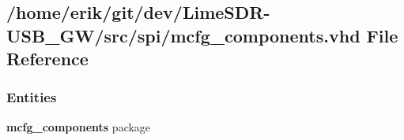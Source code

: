 \subsection{/home/erik/git/dev/\+Lime\+S\+D\+R-\/\+U\+S\+B\+\_\+\+G\+W/src/spi/mcfg\+\_\+components.vhd File Reference}
\label{mcfg__components_8vhd}
\subsubsection*{Entities}
\begin{DoxyCompactItemize}
\item 
{\bf mcfg\+\_\+components} package
\end{DoxyCompactItemize}
